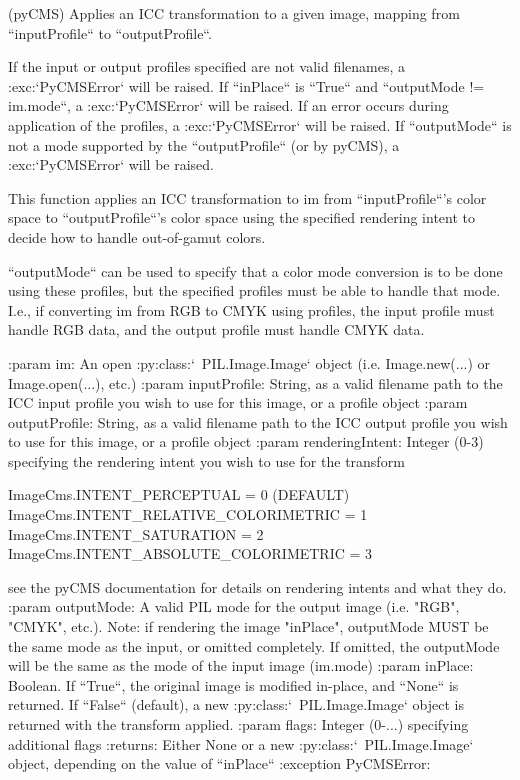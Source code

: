 \begin{DoxyVerb}(pyCMS) Applies an ICC transformation to a given image, mapping from
``inputProfile`` to ``outputProfile``.

If the input or output profiles specified are not valid filenames, a
:exc:`PyCMSError` will be raised.  If ``inPlace`` is ``True`` and
``outputMode != im.mode``, a :exc:`PyCMSError` will be raised.
If an error occurs during application of the profiles,
a :exc:`PyCMSError` will be raised.
If ``outputMode`` is not a mode supported by the ``outputProfile`` (or by pyCMS),
a :exc:`PyCMSError` will be raised.

This function applies an ICC transformation to im from ``inputProfile``'s
color space to ``outputProfile``'s color space using the specified rendering
intent to decide how to handle out-of-gamut colors.

``outputMode`` can be used to specify that a color mode conversion is to
be done using these profiles, but the specified profiles must be able
to handle that mode.  I.e., if converting im from RGB to CMYK using
profiles, the input profile must handle RGB data, and the output
profile must handle CMYK data.

:param im: An open :py:class:`~PIL.Image.Image` object (i.e. Image.new(...)
    or Image.open(...), etc.)
:param inputProfile: String, as a valid filename path to the ICC input
    profile you wish to use for this image, or a profile object
:param outputProfile: String, as a valid filename path to the ICC output
    profile you wish to use for this image, or a profile object
:param renderingIntent: Integer (0-3) specifying the rendering intent you
    wish to use for the transform

        ImageCms.INTENT_PERCEPTUAL            = 0 (DEFAULT)
        ImageCms.INTENT_RELATIVE_COLORIMETRIC = 1
        ImageCms.INTENT_SATURATION            = 2
        ImageCms.INTENT_ABSOLUTE_COLORIMETRIC = 3

    see the pyCMS documentation for details on rendering intents and what
    they do.
:param outputMode: A valid PIL mode for the output image (i.e. "RGB",
    "CMYK", etc.).  Note: if rendering the image "inPlace", outputMode
    MUST be the same mode as the input, or omitted completely.  If
    omitted, the outputMode will be the same as the mode of the input
    image (im.mode)
:param inPlace: Boolean.  If ``True``, the original image is modified in-place,
    and ``None`` is returned.  If ``False`` (default), a new
    :py:class:`~PIL.Image.Image` object is returned with the transform applied.
:param flags: Integer (0-...) specifying additional flags
:returns: Either None or a new :py:class:`~PIL.Image.Image` object, depending on
    the value of ``inPlace``
:exception PyCMSError:
\end{DoxyVerb}
 \mbox{\label{namespacePIL_1_1ImageCms_ae6c93b85ccb4034d50c4ba1873868bfa}} 
